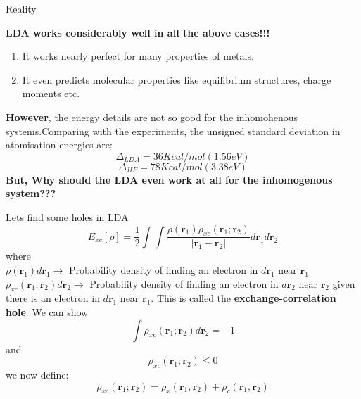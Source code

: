 \documentclass{beamer}
\begin{document}
	\begin{frame}[t]{Reality}
	 \begin{large}
	  \textbf{LDA works considerably well in all the above cases!!!}\pause
	 \end{large}
	 \begin{enumerate}
	   \item{It works nearly perfect for many properties of metals.}\pause
	   \item{It even predicts molecular properties like equilibrium structures, charge moments etc.}\pause
	   \linebreak
	  \end{enumerate}
	  \textbf{However}, the energy details are not so good for the inhomohenous systems.Comparing with the experiments, the unsigned standard deviation in atomisation energies are:
	  \begin{equation}\label{eq:3}
	  	\Delta_{LDA} = 36 Kcal/mol (1.56 eV)
	  \end{equation}
	  \begin{equation}	\label{eq:4}   
	  	\Delta_{HF} = 78 Kcal/mol (3.38 eV)
	  \end{equation}\pause
	  \large{\textbf{But, Why should the LDA even work at all for the inhomogenous system???}}
	\end{frame}
	
	\begin{frame}[t]{Lets find some holes in LDA}
	 \begin{equation}\label{eq:5}
	 E_{xc}[\rho] = \frac{1}{2}\displaystyle{\int}\displaystyle{\int} \frac{\rho(\textbf{r}_1)\rho_{xc}(\textbf{r}_1;\textbf{r}_2)}{|\textbf{r}_1-\textbf{r}_2|}d\textbf{r}_1 d\textbf{r}_2
	 \end{equation}
	 where\\
	 $\rho(\textbf{r}_1) d\textbf{r}_1 \rightarrow$ Probability density of finding an electron in $d\textbf{r}_1$ near $\textbf{r}_1$\\
	 $\rho_{xc}(\textbf{r}_1;\textbf{r}_2) d\textbf{r}_2 \rightarrow$ Probability density of finding an electron in $d\textbf{r}_2$ near $\textbf{r}_2$ given there is an electron in $d\textbf{r}_1$ near $\textbf{r}_1$. This is called the \textbf{exchange-correlation hole}. We can show\\
	\begin{equation}\label{eq:6}
	 \displaystyle{\int} \rho_{xc}(\textbf{r}_1;\textbf{r}_2) d\textbf{r}_2 = -1
	\end{equation}
	and
	\begin{equation}\label{eq:7}
	\rho_{xc}(\textbf{r}_1;\textbf{r}_2) \leqslant 0
	\end{equation}
	we now define:
	\begin{equation}\label{eq:8}
	\rho_{xc}(\textbf{r}_1;\textbf{r}_2) = \rho_{x}(\textbf{r}_1,\textbf{r}_2) + \rho_{c}(\textbf{r}_1,\textbf{r}_2)
	\end{equation}
	\end{frame}	
	
\end{document}
